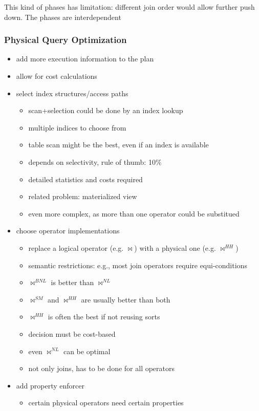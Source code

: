 \documentclass[11pt]{article}
\begin{document}
This kind of phases has limitation: different join order would allow further push down. The
phases are interdependent
\subsubsection{Physical Query Optimization}
\label{sec:org9d03ab9}
\begin{itemize}
\item add more execution information to the plan
\item allow for cost calculations
\item select index structures/access paths
\begin{itemize}
\item scan+selection could be done by an index lookup
\item multiple indices to choose from
\item table scan might be the best, even if an index is available
\item depends on selectivity, rule of thumb: 10\%
\item detailed statistics and costs required
\item related problem: materialized view
\item even more complex, as more than one operator could be substitued
\end{itemize}
\item choose operator implementations
\begin{itemize}
\item replace a logical operator (e.g. \(\bowtie\)) with a physical one (e.g. \(\bowtie^{HH}\))
\item semantic restrictions: e.g., most join operators require equi-conditions
\item \(\bowtie^{BNL}\) is better than \(\bowtie^{NL}\)
\item \(\bowtie^{SM}\) and \(\bowtie^{HH}\) are usually better than both
\item \(\bowtie^{HH}\) is often the best if not reusing sorts
\item decision must be cost-based
\item even \(\bowtie^{NL}\) can be optimal
\item not only joins, has to be done for all operators
\end{itemize}
\item add property enforcer
\begin{itemize}
\item certain physical operators need certain properties

\end{itemize}
\end{itemize}
\end{document}

